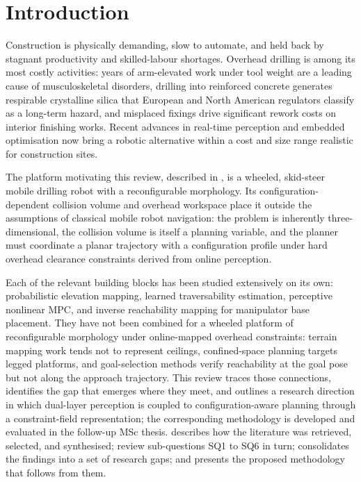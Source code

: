 \documentclass[11pt,a4paper]{article}
\begin{document}
\section{Introduction}
\label{sec:introduction}
Construction is physically demanding, slow to automate, and held back by stagnant productivity and skilled-labour shortages. Overhead drilling is among its most costly activities: years of arm-elevated work under tool weight are a leading cause of musculoskeletal disorders, drilling into reinforced concrete generates respirable crystalline silica that European and North American regulators classify as a long-term hazard, and misplaced fixings drive significant rework costs on interior finishing works. Recent advances in real-time perception and embedded optimisation now bring a robotic alternative within a cost and size range realistic for construction sites.

The platform motivating this review, described in , is a wheeled, skid-steer mobile drilling robot with a reconfigurable morphology. Its configuration-dependent collision volume and overhead workspace place it outside the assumptions of classical mobile robot navigation: the problem is inherently three-dimensional, the collision volume is itself a planning variable, and the planner must coordinate a planar trajectory with a configuration profile under hard overhead clearance constraints derived from online perception.

Each of the relevant building blocks has been studied extensively on its own: probabilistic elevation mapping, learned traversability estimation, perceptive nonlinear MPC, and inverse reachability mapping for manipulator base placement. They have not been combined for a wheeled platform of reconfigurable morphology under online-mapped overhead constraints: terrain mapping work tends not to represent ceilings, confined-space planning targets legged platforms, and goal-selection methods verify reachability at the goal pose but not along the approach trajectory. This review traces those connections, identifies the gap that emerges where they meet, and outlines a research direction in which dual-layer perception is coupled to configuration-aware planning through a constraint-field representation; the corresponding methodology is developed and evaluated in the follow-up MSc thesis.  describes how the literature was retrieved, selected, and synthesised;  review sub-questions SQ1 to SQ6 in turn;  consolidates the findings into a set of research gaps; and  presents the proposed methodology that follows from them.
\end{document}
